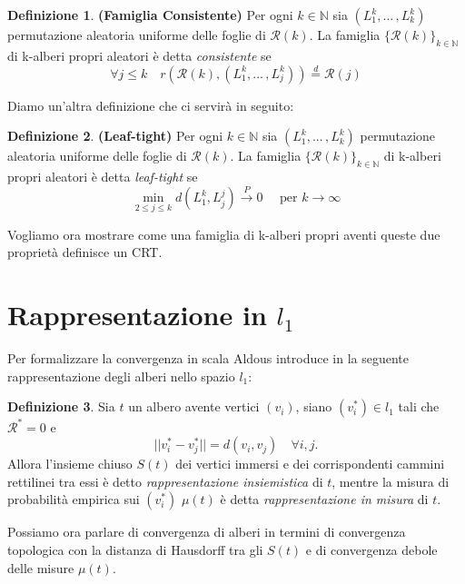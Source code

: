 \documentclass[11pt, twoside]{report}
\newcommand{\Rr}{\mathscr{R}}
\theoremstyle{definition}
\newtheorem{definizione}{Definizione}[chapter]
\theoremstyle{plain}
\theoremstyle{remark}
\numberwithin{equation}{chapter}
\begin{document}
\begin{definizione}{\textbf{(Famiglia Consistente)}}
Per ogni $k\in \mathbb{N}$ sia $(L_1^k, ... \, ,L_k^k)$ permutazione aleatoria uniforme delle foglie di $\Rr(k)$. La famiglia $\{\mathscr{R}(k)\}_{k \in \mathbb{N}}$ di k-alberi propri aleatori è detta \textit{consistente} se
\begin{equation}
\forall j\leq k \quad r(\Rr(k), (L_1^k, ...\, ,L_j^k)) \stackrel{d}{=} \Rr(j)
\end{equation}
\end{definizione}
Diamo un'altra definizione che ci servirà in seguito:

\begin{definizione}{\textbf{(Leaf-tight)}}
Per ogni $k\in \mathbb{N}$ sia $(L_1^k, ... \, ,L_k^k)$ permutazione aleatoria uniforme delle foglie di $\Rr(k)$. La famiglia $\{\mathscr{R}(k)\}_{k \in \mathbb{N}}$ di k-alberi propri aleatori è detta \textit{leaf-tight} se
\begin{equation}
\min\limits_{2\leq j \leq k} d(L_1^k,L_j^j) \xrightarrow{P} 0 \quad \text{ per } k \rightarrow \infty
\end{equation}
\end{definizione}

Vogliamo ora mostrare come una famiglia di k-alberi propri aventi queste due proprietà definisce un CRT.

\section{Rappresentazione in $l_1$}
Per formalizzare la convergenza in scala Aldous introduce in \cite{Ald1} la seguente rappresentazione degli alberi nello spazio $l_1$:
\begin{definizione}
Sia $t$ un albero avente vertici $(v_i)$, siano $(v^*_i) \in l_1$ tali che $\mathcal{R}^*=0$ e
\begin{equation}\label{eq_rapp_l1}
||v^*_i-v^*_j||=d(v_i,v_j) \quad \forall i,j.
\end{equation}
Allora l'insieme chiuso $S(t)$ dei vertici immersi e dei corrispondenti cammini rettilinei tra essi è detto \textit{rappresentazione insiemistica} di $t$, mentre la misura di probabilità empirica sui $(v^*_i)$ $\mu(t)$ è detta \textit{rappresentazione in misura} di $t$.
\end{definizione}
Possiamo ora parlare di convergenza di alberi in termini di convergenza topologica con la distanza di Hausdorff tra gli $S(t)$ e di convergenza debole delle misure $\mu(t)$.
\end{document}
